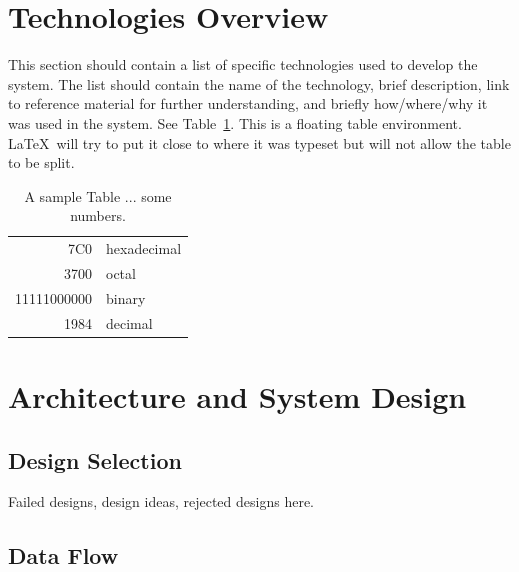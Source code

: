 \section{Technologies Overview}
This section should contain a list of specific technologies used to
develop the system.  The list should contain the name of the
technology, brief description, link to reference material for further
understanding, and briefly how/where/why it was used in the system.
See Table~\ref{somenumbers}.  This is a floating table environment.
\LaTeX\ will try to put it close to where it was typeset but will not
allow the table to be split.

\begin{table}[tbh]
\caption{A sample Table ... some numbers. \label{somenumbers}}
\begin{center}
\begin{tabular}{|r|l|}
  \hline
  7C0 & hexadecimal \\
  3700 & octal \\ \cline{2-2}
  11111000000 & binary \\
  \hline \hline
  1984 & decimal \\
  \hline
\end{tabular}
\end{center}
\end{table}


 \section{Architecture and System Design}
 
 
 
   \subsection{Design Selection}
 Failed designs, design ideas, rejected designs here.
 
 \subsection{Data Flow}
